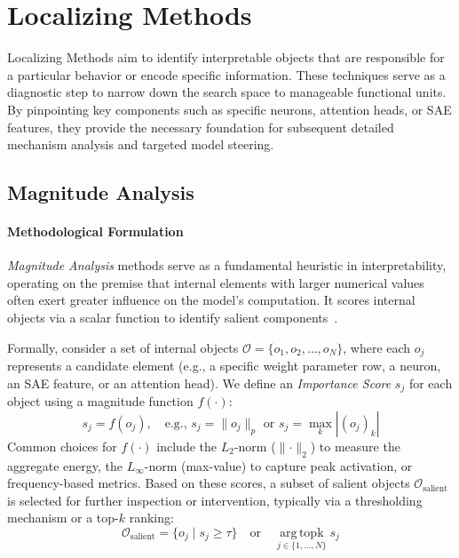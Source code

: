 \documentclass[11pt,letterpaper]{mystyle}
\begin{document}
\newpage

\section{Localizing Methods}
\label{sec:localize_methods}
Localizing Methods aim to identify interpretable objects that are responsible for a particular behavior or encode specific information. 
These techniques serve as a diagnostic step to narrow down the search space to manageable functional units. 
By pinpointing key components such as specific neurons, attention heads, or SAE features, they provide the necessary foundation for subsequent detailed mechanism analysis and targeted model steering.

\subsection{Magnitude Analysis}
\label{sec:magtitude_analysis}

\paragraph{Methodological Formulation}
\textit{Magnitude Analysis} methods serve as a fundamental heuristic in interpretability, operating on the premise that internal elements with larger numerical values often exert greater influence on the model's computation. 
It scores internal objects via a scalar function to identify salient components~\citep{dettmers2022gpt3,tang-etal-2024-language,galichin2025have}.

Formally, consider a set of internal objects $\mathcal{O} = \{o_1, o_2, \dots, o_N\}$, where each $o_j$ represents a candidate element (e.g., a specific weight parameter row, a neuron, an SAE feature, or an attention head). 
We define an \textit{Importance Score} $s_j$ for each object using a magnitude function $f(\cdot)$:
\begin{equation}
s_j = f(o_j), \quad \text{e.g., } s_j = \lVert o_j \rVert_p \text{ or } s_j = \max_{k} |(o_j)_k|
\end{equation}
Common choices for $f(\cdot)$ include the $L_2$-norm ($\lVert \cdot \rVert_2$) to measure the aggregate energy, the $L_\infty$-norm (max-value) to capture peak activation, or frequency-based metrics. Based on these scores, a subset of salient objects $\mathcal{O}_{\text{salient}}$ is selected for further inspection or intervention, typically via a thresholding mechanism or a top-$k$ ranking:
\begin{equation}
\mathcal{O}_{\text{salient}} = \{ o_j \mid s_j \geq \tau \} \quad \text{or} \quad \operatorname*{arg\,topk}_{j \in \{1,\dots,N\}} s_j
\end{equation}
\end{document}
